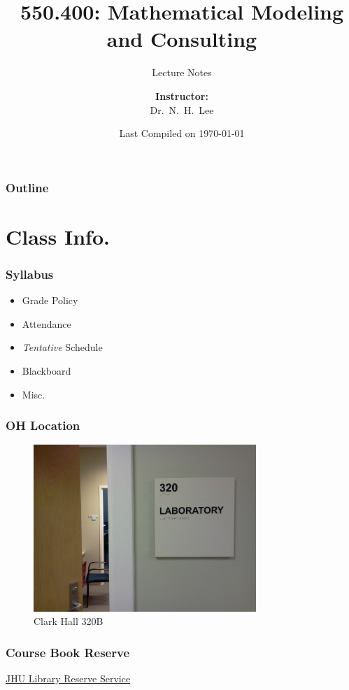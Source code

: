 \documentclass[hyperref={colorlinks=false},compress,handout,10pt]{beamer}
\title{{\color{blue} \LARGE 550.400: Mathematical Modeling and Consulting\newline} }
\subtitle{{\color{red} \large Lecture Notes} }
\author{ 
    {\bf{Instructor:}} \\ 
Dr.~N.~H.~Lee \\ 
    \vspace{5pt}
}
\institute{JHU AMS 2012 FALL}
\date{\mygreen Last Compiled on \today}
\let\olditem\item
\renewcommand{\item}{\setlength{\itemsep}{0.5\baselineskip}\olditem}
\begin{document}
\begin{frame}[plain]
  \titlepage
\end{frame}

\begin{frame}
  \frametitle{Outline}
  \tableofcontents
\end{frame}

\section{Class Info.}

\begin{frame}
    \frametitle{Syllabus}
    \begin{itemize}
        \item Grade Policy
        \item Attendance
        \item \emph{Tentative} Schedule
        \item Blackboard
        \item Misc.
    \end{itemize}
\end{frame}

\begin{frame}
    \frametitle{OH Location}
    \begin{figure}
        \caption{Clark Hall 320B}
        \begin{center}
            \includegraphics[width=0.75\textwidth]{images/Clark320B.jpg}
        \end{center}
        \label{fig:ClarkHall320B}
    \end{figure}
\end{frame}

\begin{frame}[fragile]
    \frametitle{Course Book Reserve}
    \vskip0.5in
    \begin{center}
        \href{https://catalyst.library.jhu.edu/reserves/13812}{JHU Library Reserve Service}
    \end{center}
\end{frame}
\end{document}
